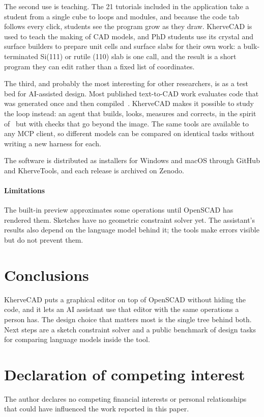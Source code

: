 \documentclass[preprint,12pt]{elsarticle}
\begin{document}
The second use is teaching. The 21 tutorials included in the application take a student from a single cube to loops and modules, and because the code tab follows every click, students see the program grow as they draw. KherveCAD is used to teach the making of CAD models, and PhD students use its crystal and surface builders to prepare unit cells and surface slabs for their own work: a bulk-terminated Si(111) or rutile (110) slab is one call, and the result is a short program they can edit rather than a fixed list of coordinates.

The third, and probably the most interesting for other researchers, is as a test bed for AI-assisted design. Most published text-to-CAD work evaluates code that was generated once and then compiled~\cite{khan2024text2cad,guan2025cadcoder}. KherveCAD makes it possible to study the loop instead: an agent that builds, looks, measures and corrects, in the spirit of~\cite{alrashedy2025cadcodeverify} but with checks that go beyond the image. The same tools are available to any MCP client, so different models can be compared on identical tasks without writing a new harness for each.

The software is distributed as installers for Windows and macOS through GitHub and KherveTools, and each release is archived on Zenodo.

\paragraph{Limitations} The built-in preview approximates some operations until OpenSCAD has rendered them. Sketches have no geometric constraint solver yet. The assistant's results also depend on the language model behind it; the tools make errors visible but do not prevent them.

\section{Conclusions}

KherveCAD puts a graphical editor on top of OpenSCAD without hiding the code, and it lets an AI assistant use that editor with the same operations a person has. The design choice that matters most is the single tree behind both. Next steps are a sketch constraint solver and a public benchmark of design tasks for comparing language models inside the tool.

\section*{Declaration of competing interest}
The author declares no competing financial interests or personal relationships that could have influenced the work reported in this paper.
\end{document}
